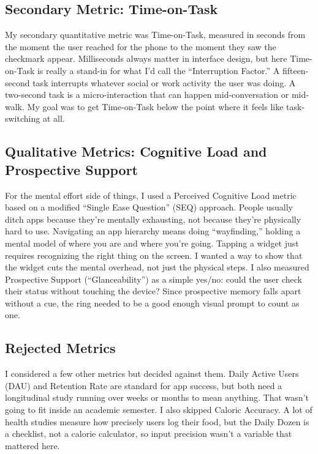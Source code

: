\documentclass[10pt,twocolumn]{article}
\begin{document}
\subsection{Secondary Metric: Time-on-Task}

My secondary quantitative metric was Time-on-Task, measured in seconds from the moment the user reached for the phone to the moment they saw the checkmark appear. Milliseconds always matter in interface design, but here Time-on-Task is really a stand-in for what I'd call the ``Interruption Factor.'' A fifteen-second task interrupts whatever social or work activity the user was doing. A two-second task is a micro-interaction that can happen mid-conversation or mid-walk. My goal was to get Time-on-Task below the point where it feels like task-switching at all.

\subsection{Qualitative Metrics: Cognitive Load and Prospective Support}

For the mental effort side of things, I used a Perceived Cognitive Load metric based on a modified ``Single Ease Question'' (SEQ) approach. People usually ditch apps because they're mentally exhausting, not because they're physically hard to use.\cite{AppleHIGWidgets} Navigating an app hierarchy means doing ``wayfinding,'' holding a mental model of where you are and where you're going. Tapping a widget just requires recognizing the right thing on the screen. I wanted a way to show that the widget cuts the mental overhead, not just the physical steps. I also measured Prospective Support (``Glanceability'') as a simple yes/no: could the user check their status without touching the device? Since prospective memory falls apart without a cue, the ring needed to be a good enough visual prompt to count as one.

\subsection{Rejected Metrics}

I considered a few other metrics but decided against them. Daily Active Users (DAU) and Retention Rate are standard for app success, but both need a longitudinal study running over weeks or months to mean anything.\cite{MatthewsGlanceability} That wasn't going to fit inside an academic semester. I also skipped Caloric Accuracy. A lot of health studies measure how precisely users log their food, but the Daily Dozen is a checklist, not a calorie calculator, so input precision wasn't a variable that mattered here.
\end{document}
